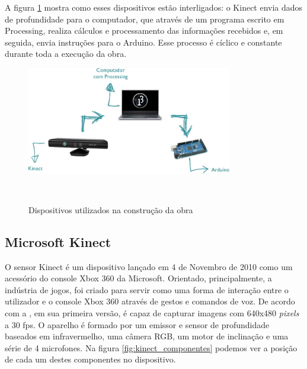 A figura \ref{fig:dispositivos} mostra como esses dispositivos estão interligados: o Kinect envia dados de profundidade para o computador, que através de um programa escrito em Processing, realiza cálculos e processamento das informações recebidos e, em seguida, envia instruções para o Arduino. Esse processo é cíclico e constante durante toda a execução da obra.

\begin{figure}[H]
  \begin{center}
    \caption{Dispositivos utilizados na construção da obra}
    \vspace*{0,2cm}
    \includegraphics[width=0.8\textwidth]{./04-figuras/dispositivos}
    \label{fig:dispositivos}
  \end{center}
  \vspace*{-0,9cm}
  \\
\end{figure}


\subsection{Microsoft Kinect}

O sensor Kinect é um dispositivo lançado em 4 de Novembro de 2010 como um acessório do console Xbox 360 da Microsoft. Orientado, principalmente, a indústria de jogos, foi criado para servir como uma forma de interação entre o utilizador e o console Xbox 360 através de gestos e comandos de voz. De acordo com a , em sua primeira versão, é capaz de capturar imagens com 640x480 \textit{pixels} a 30 fps. O aparelho é formado por um emissor e sensor de profundidade baseados em infravermelho, uma câmera RGB, um motor de inclinação e uma série de 4 microfones. Na figura \ref{fig:kinect_componentes} podemos ver a posição de cada um destes componentes no dispositivo.

